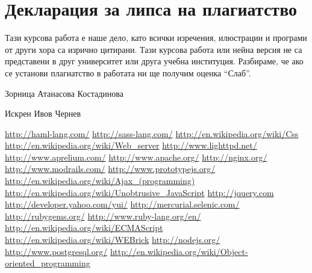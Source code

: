 \documentclass[a4paper]{article}
\begin{document}
\newpage

\section{Декларация за липса на плагиатство}
Тази курсова работа е наше дело, като всички изречения, илюстрации и програми от други хора са изрично цитирани.
Тази курсова работа или нейна версия не са представени в друг университет или друга учебна институция.
Разбираме, че ако се установи плагиатство в работата ни ще получим оценка “Слаб”.

\vspace{2cm}
Зорница Атанасова Костадинова

\vspace{2cm}
Искрен Ивов Чернев

\newpage

\begin{thebibliography}{99}
   \url{http://haml-lang.com/}
   \url{http://sass-lang.com/}
   \url{http://en.wikipedia.org/wiki/Css}
   \url{http://en.wikipedia.org/wiki/Web\_server}
   \url{http://www.lighttpd.net/}
   \url{http://www.aprelium.com/}
   \url{http://www.apache.org/}
   \url{http://nginx.org/}
   \url{http://www.modrails.com/}
   \url{http://www.prototypejs.org/}
   \url{http://en.wikipedia.org/wiki/Ajax\_(programming)}
   \url{http://en.wikipedia.org/wiki/Unobtrusive\_JavaScript}
   \url{http://jquery.com}
   \url{http://developer.yahoo.com/yui/}
   \url{http://mercurial.selenic.com/}
   \url{http://rubygems.org/}
   \url{http://www.ruby-lang.org/en/}
   \url{http://en.wikipedia.org/wiki/ECMAScript}
   \url{http://en.wikipedia.org/wiki/WEBrick}
   \url{http://nodejs.org/}
   \url{http://www.postgresql.org/}
   \url{http://en.wikipedia.org/wiki/Object-oriented\_programming}
\end{thebibliography}
\end{document}
